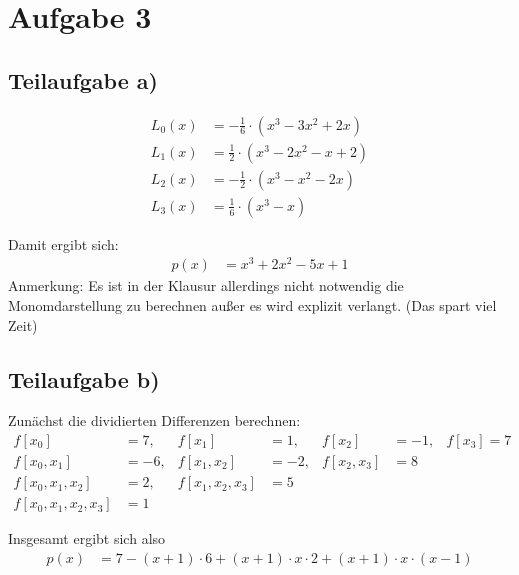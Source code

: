 \section*{Aufgabe 3}
\subsection*{Teilaufgabe a)}
\begin{align}
	L_0(x) &= - \frac{1}{6} \cdot (x^3 - 3 x^2 + 2x)\\
	L_1(x) &= \frac{1}{2} \cdot (x^3 - 2x^2 - x + 2)\\
	L_2(x) &= - \frac{1}{2} \cdot (x^3 - x^2 - 2x)\\
	L_3(x) &= \frac{1}{6} \cdot (x^3 - x)
\end{align}

Damit ergibt sich:
\begin{align}
	p(x) &= x^3 + 2x^2 - 5x + 1
\end{align}
Anmerkung: Es ist in der Klausur allerdings nicht notwendig die Monomdarstellung zu berechnen außer es wird explizit verlangt. (Das spart viel Zeit) %

\subsection*{Teilaufgabe b)}
Zunächst die dividierten Differenzen berechnen:
\begin{align}
	f[x_0] &= 7,           &f[x_1] &= 1,       & f[x_2] &= -1,     & f[x_3] = 7\\
	f[x_0, x_1] &= -6,     &f[x_1, x_2] &= -2, &f[x_2, x_3] &= 8\\
	f[x_0, x_1, x_2] &= 2, &f[x_1, x_2, x_3] &= 5\\
	f[x_0, x_1, x_2, x_3] &= 1
\end{align}

Insgesamt ergibt sich also
\begin{align}
	p(x) &= 7 - (x+1) \cdot 6 + (x+1) \cdot x \cdot 2 + (x+1) \cdot x \cdot (x-1)
\end{align}

